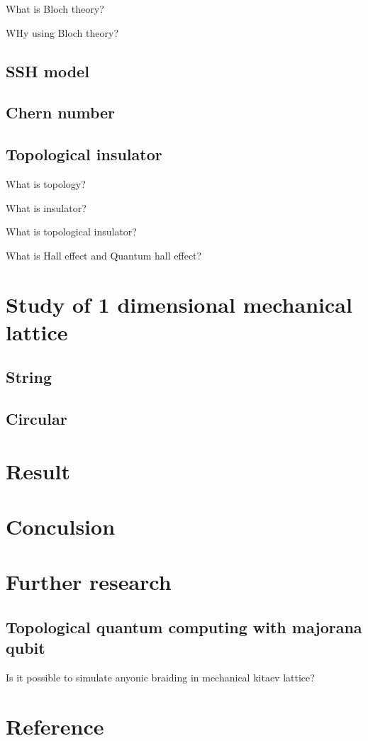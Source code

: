 \documentclass[a4paper]{article}
\begin{document}
\begin{multicols*}{2}
    What is Bloch theory?

    WHy using Bloch theory?

    \subsection{SSH model}

    \subsection{Chern number}

    \subsection{Topological insulator}

    What is topology?

    What is insulator?

    What is topological insulator?

    What is Hall effect and Quantum hall effect?

    \section{Study of 1 dimensional mechanical lattice}

    \subsection{String}

    \subsection{Circular}

    \section{Result}

    \section{Conculsion}

    \section{Further research}

    \subsection{Topological quantum computing with majorana qubit}

    Is it possible to simulate anyonic braiding in mechanical kitaev lattice?


    \section{Reference}


\end{multicols*}
\end{document}
